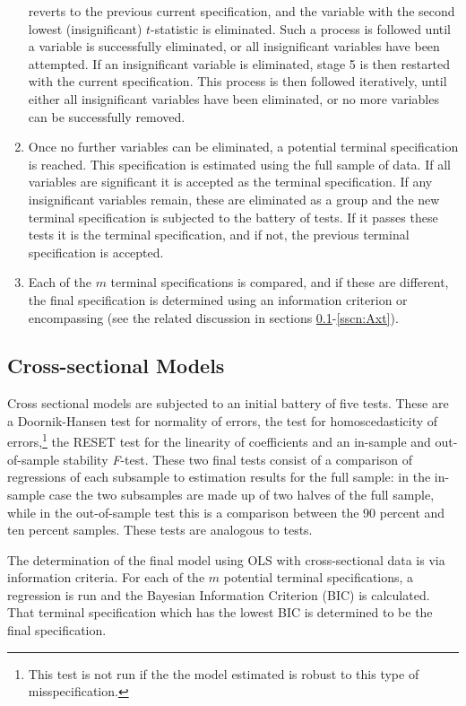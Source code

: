 \documentclass[bib]{statapress}
\begin{document}
\begin{enumerate}
 reverts to the previous current specification, and the variable with the 
 second lowest (insignificant) $t$-statistic is eliminated.  Such a process is
 followed until a variable is successfully eliminated, or all insignificant
 variables have been attempted.  If an insignificant variable is eliminated,
 stage 5 is then restarted with the current specification.  This process is 
 then followed iteratively, until either all insignificant variables have been
 eliminated, or no more variables can be successfully removed.
 \item Once no further variables can be eliminated, a potential terminal 
 specification is reached.  This specification is estimated using the full 
 sample of data.  If all variables are significant it is accepted as the 
 terminal specification.  If any insignificant variables remain, these are 
 eliminated as a group and the new terminal specification is subjected to the 
 battery of tests.  If it passes these tests it is the terminal specification,
 and if not, the previous terminal specification is accepted.
 \item Each of the $m$ terminal specifications is compared, and if these are 
 different, the final specification is determined using an information 
 criterion or encompassing (see the related discussion in sections 
 \ref{sscn:Acs}-\ref{sscn:Axt}).
\end{enumerate}

\subsection{Cross-sectional Models}
\label{sscn:Acs}
Cross sectional models are subjected to an initial battery of five tests.  
These are a Doornik-Hansen test for normality of errors, the 
\citet{BreuschPagan1979} test for homoscedasticity of errors,\footnote{This 
test is not run if the the model estimated is robust to this type of 
misspecification.} the RESET test for the linearity of coefficients 
\citep{Ramsey1969} and an in-sample and out-of-sample stability \emph{F}-test.
These two final tests consist of a comparison of regressions of each subsample
to estimation results for the full sample: in the in-sample case the two 
subsamples are made up of two halves of the full sample, while in the 
out-of-sample test this is a comparison between the 90 percent and ten percent
samples.  These tests are analogous to \citet{Chow1960} tests.

The determination of the final model using OLS with cross-sectional data is via
information criteria.  For each of the $m$ potential terminal specifications, a
regression is run and the Bayesian Information Criterion (BIC) is calculated.
That terminal specification which has the lowest BIC is determined to be the 
final specification.
\end{document}
